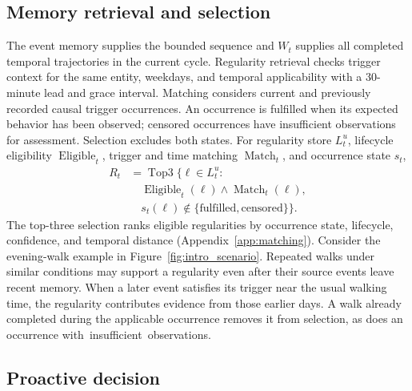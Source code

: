 \subsection{Memory retrieval and selection}

The event memory supplies the bounded sequence and $W_t$ supplies all completed temporal trajectories in the current cycle.
Regularity retrieval checks trigger context for the same entity, weekdays, and temporal applicability with a 30-minute lead and grace interval.
Matching considers current and previously recorded causal trigger occurrences.
An occurrence is fulfilled when its expected behavior has been observed; censored occurrences have insufficient observations for assessment.
Selection excludes both states.
For regularity store $L_t^u$, lifecycle eligibility $\operatorname{Eligible}_t$, trigger and time matching $\operatorname{Match}_t$, and occurrence state $s_t$,
\begin{equation}
\begin{aligned}
R_t&=\operatorname{Top3}\big\{\ell\in L_t^u:\\
&\quad\operatorname{Eligible}_t(\ell)\land\operatorname{Match}_t(\ell),\\
&\quad s_t(\ell)\notin\{\text{fulfilled},\text{censored}\}\big\}.
\end{aligned}
\label{eq:long_term_retrieval}
\end{equation}
The top-three selection ranks eligible regularities by occurrence state, lifecycle, confidence, and temporal distance (Appendix~\ref{app:matching}).
Consider the evening-walk example in Figure~\ref{fig:intro_scenario}.
Repeated walks under similar conditions may support a regularity even after their source events leave recent memory.
When a later event satisfies its trigger near the usual walking time, the regularity contributes evidence from those earlier days.
A walk already completed during the applicable occurrence removes it from selection, as does an occurrence \mbox{with insufficient observations}.

\subsection{Proactive decision}
\label{sec:decision_control}

